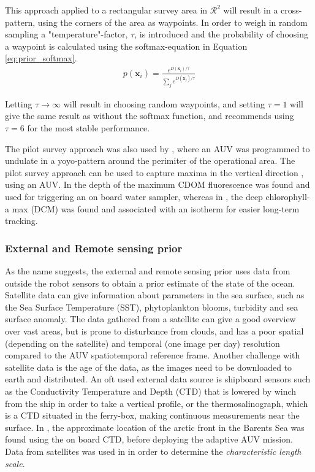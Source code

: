 This approach applied to a rectangular survey area in $\mathcal{R}^2$ will result in a cross-pattern, using the corners of the area as waypoints. In order to weigh in random sampling a "temperature"-factor, $\tau$, is introduced and the probability of choosing a waypoint is calculated using the softmax-equation \cite{sutton1998introduction} in Equation \ref{eq:prior_softmax}. 
\begin{align}
    \label{eq:prior_softmax}
    p(\mathbf{x}_i) = \frac{e^{D(\mathbf{x}_i)/\tau}}{\sum_j e^{D(\mathbf{x}_j)/\tau}}
\end{align}

Letting $\tau \rightarrow \infty$ will result in choosing random waypoints, and setting $\tau = 1$ will give the same result as without the softmax function, and \cite{kemna2018multi} recommends using $\tau = 6$ for the most stable performance. 

The pilot survey approach was also used by \textcite{fossum2019toward}, where an AUV was programmed to undulate in a yoyo-pattern around the perimiter of the operational area. The pilot survey approach can be used to capture maxima in the vertical direction \cite{zhang2011peak,zhang2019autonomous}, using an AUV. In \textcite{zhang2011peak} the depth of the maximum CDOM fluorescence was found and used for triggering an on board water sampler, whereas in \textcite{zhang2019autonomous}, the deep chlorophyll-a max (DCM) was found and associated with an isotherm for easier long-term tracking. 


\subsubsection{External and Remote sensing prior}
As the name suggests, the external and remote sensing prior uses data from outside the robot sensors to obtain a prior estimate of the state of the ocean. Satellite data can give information about parameters in the sea surface, such as the Sea Surface Temperature (SST), phytoplankton blooms, turbidity and sea surface anomaly. The data gathered from a satellite can give a good overview over vast areas, but is prone to disturbance from clouds, and has a poor spatial (depending on the satellite) and temporal (one image per day) resolution compared to the AUV spatiotemporal reference frame. Another challenge with satellite data is the age of the data, as the images need to be downloaded to earth and distributed. An oft used external data source is shipboard sensors such as the Conductivity Temperature and Depth (CTD) that is lowered by winch from the ship in order to take a vertical profile, or the thermosalinograph, which is a CTD situated in the ferry-box, making continuous measurements near the surface. In \cite{fossum2021adaptive}, the approximate location of the arctic front in the Barents Sea was found using the on board CTD, before deploying the adaptive AUV mission. Data from satellites was used in \cite{fossum2019toward} in order to determine the \textit{characteristic length scale}.


